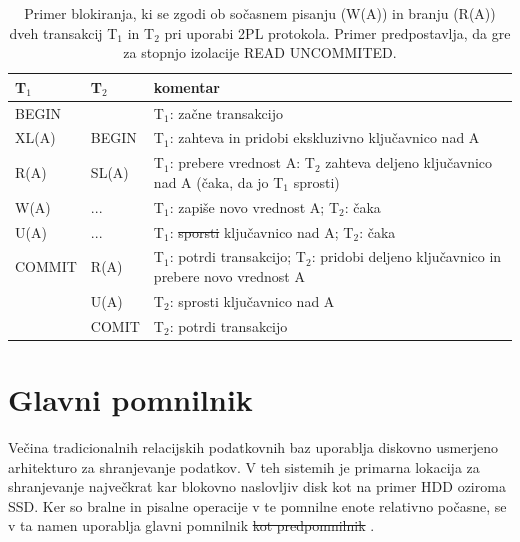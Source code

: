 \documentclass[a4paper, 12pt]{book}
\providecommand{\DIFaddtex}[1]{{\protect\color{blue}\uwave{#1}}} %
\providecommand{\DIFdeltex}[1]{{\protect\color{red}\sout{#1}}}                      %
\providecommand{\DIFaddbegin}{} %
\providecommand{\DIFaddend}{} %
\providecommand{\DIFdelbegin}{} %
\providecommand{\DIFdelend}{} %
\providecommand{\DIFaddFL}[1]{\DIFadd{#1}} %
\providecommand{\DIFdelFL}[1]{\DIFdel{#1}} %
\providecommand{\DIFaddbeginFL}{} %
\providecommand{\DIFaddendFL}{} %
\providecommand{\DIFdelbeginFL}{} %
\providecommand{\DIFdelendFL}{} %
\providecommand{\DIFadd}[1]{\texorpdfstring{\DIFaddtex{#1}}{#1}} %
\providecommand{\DIFdel}[1]{\texorpdfstring{\DIFdeltex{#1}}{}} %
\newcommand{\DIFscaledelfig}{0.5}
\newlength{\DIFdelgraphicswidth} %
\newlength{\DIFdelgraphicsheight} %
\newcommand{\DIFaddincludegraphics}[2][]{{\color{blue}\fbox{\DIFOincludegraphics[#1]{#2}}}} %
\newcommand{\DIFdelincludegraphics}[2][]{%
\sbox{\DIFdelgraphicsbox}{\DIFOincludegraphics[#1]{#2}}%
\settoboxwidth{\DIFdelgraphicswidth}{\DIFdelgraphicsbox} %
\settoboxtotalheight{\DIFdelgraphicsheight}{\DIFdelgraphicsbox} %
\scalebox{\DIFscaledelfig}{%
\parbox[b]{\DIFdelgraphicswidth}{\usebox{\DIFdelgraphicsbox}\\[-\baselineskip] \rule{\DIFdelgraphicswidth}{0em}}\llap{\resizebox{\DIFdelgraphicswidth}{\DIFdelgraphicsheight}{%
\setlength{\unitlength}{\DIFdelgraphicswidth}%
\begin{picture}(1,1)%
\thicklines\linethickness{2pt} %
{\color[rgb]{1,0,0}\put(0,0){\framebox(1,1){}}}%
{\color[rgb]{1,0,0}\put(0,0){\line( 1,1){1}}}%
{\color[rgb]{1,0,0}\put(0,1){\line(1,-1){1}}}%
\end{picture}%
}\hspace*{3pt}}} %
} %
\DeclareRobustCommand{\DIFaddbegin}{\DIFOaddbegin \let\includegraphics\DIFaddincludegraphics} %
\DeclareRobustCommand{\DIFaddend}{\DIFOaddend \let\includegraphics\DIFOincludegraphics} %
\DeclareRobustCommand{\DIFdelbegin}{\DIFOdelbegin \let\includegraphics\DIFdelincludegraphics} %
\DeclareRobustCommand{\DIFdelend}{\DIFOaddend \let\includegraphics\DIFOincludegraphics} %
\DeclareRobustCommand{\DIFaddbeginFL}{\DIFOaddbeginFL \let\includegraphics\DIFaddincludegraphics} %
\DeclareRobustCommand{\DIFaddendFL}{\DIFOaddendFL \let\includegraphics\DIFOincludegraphics} %
\DeclareRobustCommand{\DIFdelbeginFL}{\DIFOdelbeginFL \let\includegraphics\DIFdelincludegraphics} %
\DeclareRobustCommand{\DIFdelendFL}{\DIFOaddendFL \let\includegraphics\DIFOincludegraphics} %
\begin{document}
\begin{table}[H]
\begin{center}
\begin{tabular}{p{}|p{}|p{}} 
    \textbf{T$_{\text{1}}$} & \textbf{T$_{\text{2}}$} & \textbf{komentar} \\
\hline
BEGIN  &        & T$_{\text{1}}$: začne transakcijo \\
XL(A)  & BEGIN  & T$_{\text{1}}$: zahteva in pridobi ekskluzivno ključavnico nad A \\
R(A)   & SL(A)  & T$_{\text{1}}$: prebere vrednost A: T$_{\text{2}}$ zahteva deljeno ključavnico nad A (čaka, da jo T$_{\text{1}}$ sprosti) \\
W(A)   & ...    & T$_{\text{1}}$: zapiše novo vrednost A; T$_{\text{2}}$: čaka  \\
U(A)   & ...    & T$_{\text{1}}$: \DIFdelbeginFL \DIFdelFL{sporsti }\DIFdelendFL \DIFaddbeginFL \DIFaddFL{sprosti }\DIFaddendFL ključavnico nad A; T$_{\text{2}}$: čaka \\
COMMIT & R(A)    & T$_{\text{1}}$: potrdi transakcijo; T$_{\text{2}}$: pridobi deljeno ključavnico in prebere novo vrednost A \\
        & U(A)   & T$_{\text{2}}$: sprosti ključavnico nad A \\
        & COMIT  & T$_{\text{2}}$: potrdi transakcijo \\
\end{tabular}
\end{center}
\caption{Primer \cite{lecture-2pl} blokiranja, ki se zgodi ob sočasnem pisanju (W(A)) in branju (R(A)) dveh transakcij T$_{\text{1}}$ in T$_{\text{2}}$ pri uporabi 2PL protokola. Primer predpostavlja, da gre za stopnjo izolacije READ UNCOMMITED. }
\label{tbl_cc_2pl_example}
\end{table}

\section{Glavni pomnilnik}

Večina tradicionalnih relacijskih podatkovnih baz uporablja diskovno usmerjeno arhitekturo za shranjevanje podatkov. V teh sistemih je primarna lokacija za shranjevanje največkrat kar blokovno naslovljiv disk kot na primer HDD oziroma SSD. Ker so bralne in pisalne operacije v te pomnilne enote relativno počasne, se v ta namen \DIFaddbegin \DIFadd{kot predpomnilnik }\DIFaddend uporablja glavni pomnilnik \DIFdelbegin \DIFdel{kot predpomnilnik }\DIFdelend \cite{Pavlo2016Sep}.
\end{document}
